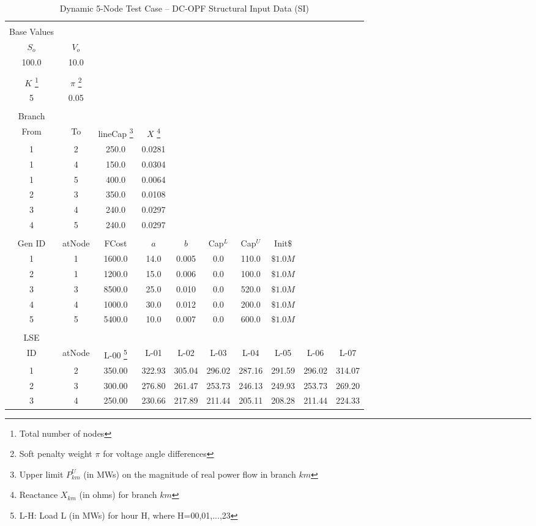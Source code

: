 \documentclass[12pt]{article}
\begin{document}
\begin{table}[h]
	\caption{Dynamic 5-Node Test Case -- DC-OPF Structural Input Data (SI)} 
	\label{tab: 5NodeInput}
\begin{minipage}{\textwidth}
	\centering
\begin{tabular}{cccccccccc} 

\hline\hline\\[0.1ex]
Base Values 
  	& \mbox{}	\\
$S_o$ &	$V_o$	\\	
   100.0	     &     10.0		\\ \\

$K$%
\footnote{Total number of nodes}
 & $\pi$%
\footnote{Soft penalty weight $\pi$ for voltage angle differences}
  \\
5 &  0.05   \\
  
\\ Branch \\ 
From&	To&	lineCap%
\footnote{Upper limit $P^U_{km}$ (in MWs) on the magnitude of real power flow in branch $km$} &  $X$%
\footnote{Reactance $X_{km}$ (in ohms) for branch $km$}
 \\[0.5ex]
 	1 & 2 & 250.0	& 0.0281     \\
 	1 & 4 & 150.0	& 0.0304     \\
 	1 & 5 & 400.0	& 0.0064     \\
	2 & 3 & 350.0	& 0.0108     \\
	3 & 4 & 240.0	& 0.0297     \\
	4 & 5 & 240.0	& 0.0297     \\

  
\\ 
Gen ID & atNode & FCost   &  $a$     &   $b$    & Cap$^L$    & Cap$^U$     &  Init$\$$ \\[0.5ex]
  1	& 1	& 1600.0  & 14.0   & 0.005     & 0.0	   & 110.0       &  $\$1.0M$    \\
  2	& 1	& 1200.0  & 15.0   & 0.006     & 0.0	   & 100.0       &  $\$1.0M$  \\
  3	& 3	& 8500.0  & 25.0   & 0.010     & 0.0	   & 520.0       &  $\$1.0M$ \\
  4	& 4	& 1000.0  & 30.0   & 0.012     & 0.0	   & 200.0       &  $\$1.0M$ \\
  5	& 5	& 5400.0  & 10.0   & 0.007     & 0.0	   & 600.0       &  $\$1.0M$ \\



\\ LSE \\ ID &	atNode & L-00%
\footnote{L-H: Load L (in MWs) for hour H, where H=00,01,...,23}
 & L-01	& L-02	& L-03	& L-04	& L-05	& L-06	& L-07\\[0.5ex]
1	&	2	&	350.00	&	322.93	&	305.04	&	296.02	&	287.16	&	291.59	&	296.02	&	314.07 \\
2	&	3	&	300.00	&	276.80	&	261.47	&	253.73	&	246.13	&	249.93	&	253.73	&	269.20 \\
3	&	4	&	250.00	&	230.66	&	217.89	&	211.44	&	205.11	&	208.28	&	211.44	&	224.33 \\


\end{tabular}
\end{minipage}
\end{table}
\end{document}
